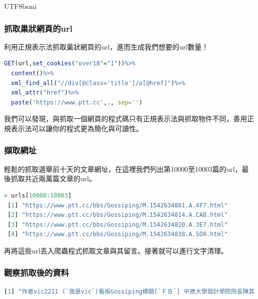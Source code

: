 \documentclass[utf8]{beamer}
\begin{document}
\begin{CJK}{UTF8}{bsmi}
\begin{frame}[fragile]
\frametitle{抓取巢狀網頁的url}
利用正規表示法抓取巢狀網頁的url，進而生成我們想要的url數量！
\begin{lstlisting}[language=R,identifierstyle=\color{blue},stringstyle=\color{orange},keywordstyle=\color{green!60!black}\bfseries]
GET(url,set_cookies("over18"="1"))%>%
  content()%>%
  xml_find_all("//div[@class='title']/a[@href]")%>%
  xml_attr("href")%>%
  paste('https://www.ptt.cc',., sep='')
\end{lstlisting}
我們可以發現，與抓取一個網頁的程式碼只有正規表示法與抓取物件不同，善用正規表示法可以讓你的程式更為簡化與可讀性。
\end{frame}

\begin{frame}[fragile]
\frametitle{擷取網址}
輕鬆的抓取選舉前十天的文章網址，在這裡我們列出第10000至10003篇的url，最後抓取共近兩萬篇文章的url。
\begin{lstlisting}[language=R,identifierstyle=\color{blue},stringstyle=\color{orange},keywordstyle=\color{green!60!black}\bfseries]
> urls[10000:10003]
 [1] "https://www.ptt.cc/bbs/Gossiping/M.1542634801.A.4F7.html"
 [2] "https://www.ptt.cc/bbs/Gossiping/M.1542634814.A.CAB.html"
 [3] "https://www.ptt.cc/bbs/Gossiping/M.1542634820.A.3E7.html"
 [4] "https://www.ptt.cc/bbs/Gossiping/M.1542634838.A.5D8.html"
\end{lstlisting}
再將這些url丟入爬蟲程式抓取文章與其留言。接著就可以進行文字清理。
\end{frame}

\begin{frame}[fragile]
\frametitle{觀察抓取後的資料}
\begin{lstlisting}[language=R,backgroundcolor=\color{lightgray!0!white},identifierstyle=\color{blue},stringstyle=\color{orange},keywordstyle=\color{green!60!black}\bfseries]
[1] "作者vic2211 (`我是vic`)看板Gossiping標題[`ＦＢ`] 中原大學設計學院院長陳其澎時間Mon Nov 19 21:40:12 2018\nＦＢ卦點說明：陳院長光速打臉韓導 說韓導肯定是遇到金光黨了\n\nhttps://www.facebook.com/chiepeng/posts/2415337508482774\n\n\n陳其澎\n9 分鐘 ·\n我是中原大學設計學院院長陳其澎，我發誓我從來沒有見過韓國瑜，更沒有帶五個學生去\n看你的摩天輪，你在說什麼？我完全不知道，你肯定碰到金光黨了。\n\n--\n※ 發信站: 批踢踢實業坊(ptt.cc), 來自: 220.141.18.148\n※ 文章網址: https://www.ptt.cc/bbs/Gossiping/M.1542634814.A.CAB.html... <truncated>
\end{lstlisting}
\end{frame}


\end{CJK}
\end{document}
